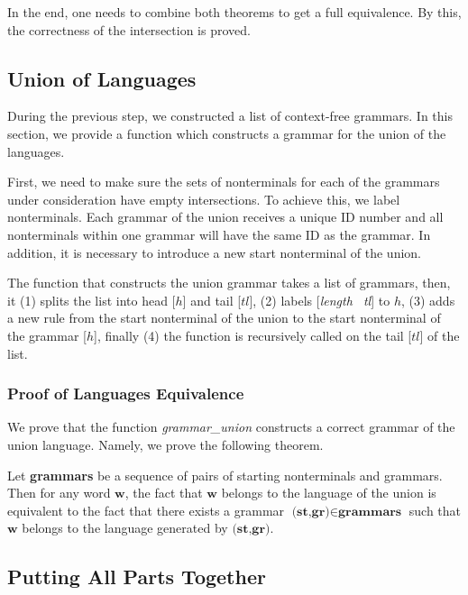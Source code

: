 \documentclass[runningheads]{llncs}
\begin{document}
In the end, one needs to combine both theorems to get a full equivalence. By this, the correctness of the intersection is proved.

\subsection{Union of Languages}

During the previous step, we constructed a list of context-free grammars. In this section, we provide a function which constructs a grammar for the union of the languages.

First, we need to make sure the sets of nonterminals for each of the grammars under consideration have empty intersections. To achieve this, we label nonterminals. Each grammar of the union receives a unique ID number and all nonterminals within one grammar will have the same ID as the grammar. In addition, it is necessary to introduce a new start nonterminal of the union.

The function that constructs the union grammar takes a list of grammars, then, it (1) splits the list into head [$h$] and tail [$tl$], (2) labels [\textit{length \ tl}] to $h$, (3) adds a new rule from the start nonterminal of the union to the start nonterminal of the grammar [$h$], finally (4) the function is recursively called on the tail [$tl$] of the list.

\subsubsection{Proof of Languages Equivalence}

We prove that the function \textit{grammar\_union} constructs a correct grammar of the union language. Namely, we prove the following theorem.

\begin{theorem} \label{theorem-correct-union}
    Let \textbf{grammars} be a sequence of pairs of starting nonterminals and grammars. Then for any word $\textbf{w}$, the fact that $\textbf{w}$ belongs to the language of the union is equivalent to the fact that there exists a grammar $\textbf{(st,gr)} \in \textbf{grammars}$ such that $\textbf{w}$ belongs to the language generated by $\textbf{(st,gr)}$.
\end{theorem}


\subsection{Putting All Parts Together}
\end{document}
